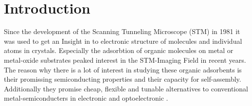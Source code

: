 \chapter{Introduction \label{sec:intro}}
Since the development of the Scanning Tunneling Microscope (STM) in 1981 it was used to get an Insight in to electronic structure of molecules and individual atoms in crystals.
Especially the adsorbtion of organic molecules on metal or metal-oxide substrates peaked interest in the STM-Imaging Field in recent years.
The reason why there is a lot of interest in studying these organic adsorbents is their promissing semiconducting properties and their capacity for self-assembly.
Additionally they promise cheap, flexible and tunable alternatives to conventional metal-semiconducters in electronic and optoelectronic \cite{OTERO2017105}.
